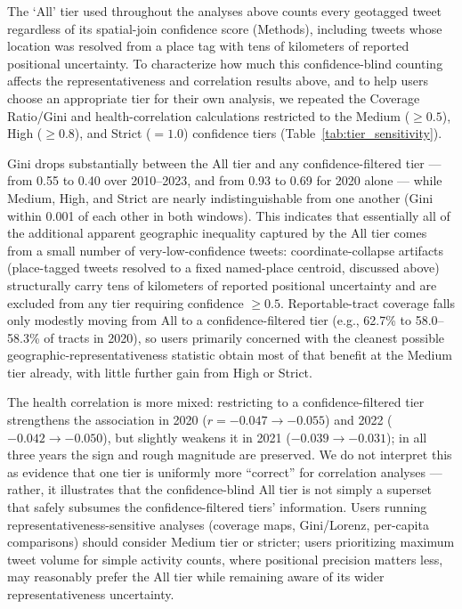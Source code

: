 \documentclass[fleqn,10pt]{wlscirep}
\begin{document}
The `All' tier used throughout the analyses above counts every geotagged tweet regardless of its spatial-join confidence score (Methods), including tweets whose location was resolved from a place tag with tens of kilometers of reported positional uncertainty. To characterize how much this confidence-blind counting affects the representativeness and correlation results above, and to help users choose an appropriate tier for their own analysis, we repeated the Coverage Ratio/Gini and health-correlation calculations restricted to the Medium ($\ge 0.5$), High ($\ge 0.8$), and Strict ($=1.0$) confidence tiers (Table~\ref{tab:tier_sensitivity}).

Gini drops substantially between the All tier and any confidence-filtered tier --- from 0.55 to 0.40 over 2010--2023, and from 0.93 to 0.69 for 2020 alone --- while Medium, High, and Strict are nearly indistinguishable from one another (Gini within 0.001 of each other in both windows). This indicates that essentially all of the additional apparent geographic inequality captured by the All tier comes from a small number of very-low-confidence tweets: coordinate-collapse artifacts (place-tagged tweets resolved to a fixed named-place centroid, discussed above) structurally carry tens of kilometers of reported positional uncertainty and are excluded from any tier requiring confidence $\ge 0.5$. Reportable-tract coverage falls only modestly moving from All to a confidence-filtered tier (e.g., 62.7\% to 58.0--58.3\% of tracts in 2020), so users primarily concerned with the cleanest possible geographic-representativeness statistic obtain most of that benefit at the Medium tier already, with little further gain from High or Strict.

The health correlation is more mixed: restricting to a confidence-filtered tier strengthens the association in 2020 ($r=-0.047\rightarrow-0.055$) and 2022 ($-0.042\rightarrow-0.050$), but slightly weakens it in 2021 ($-0.039\rightarrow-0.031$); in all three years the sign and rough magnitude are preserved. We do not interpret this as evidence that one tier is uniformly more ``correct'' for correlation analyses --- rather, it illustrates that the confidence-blind All tier is not simply a superset that safely subsumes the confidence-filtered tiers' information. Users running representativeness-sensitive analyses (coverage maps, Gini/Lorenz, per-capita comparisons) should consider Medium tier or stricter; users prioritizing maximum tweet volume for simple activity counts, where positional precision matters less, may reasonably prefer the All tier while remaining aware of its wider representativeness uncertainty.
\end{document}
